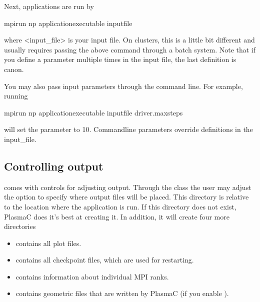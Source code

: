 \documentclass[letterpaper,10pt,english]{sphinxmanual}
\begin{document}
Next, applications are run by

\begin{sphinxVerbatim}[commandchars=\\\{\},formatcom=\scriptsize]
mpirun \PYGZhy{}np  \PYGZlt{}application\PYGZus{}executable\PYGZgt{} \PYGZlt{}input\PYGZus{}file\PYGZgt{}
\end{sphinxVerbatim}

where \textless{}input\_file\textgreater{} is your input file. On clusters, this is a little bit different and usually requires passing the above command through a batch system. Note that if you define a parameter multiple times in the input file, the last definition is canon.

You may also pass input parameters through the command line. For example, running

\begin{sphinxVerbatim}[commandchars=\\\{\},formatcom=\scriptsize]
mpirun \PYGZhy{}np  \PYGZlt{}application\PYGZus{}executable\PYGZgt{} \PYGZlt{}input\PYGZus{}file\PYGZgt{} driver.max\PYGZus{}steps
\end{sphinxVerbatim}

will set the  parameter to 10. Command\sphinxhyphen{}line parameters override definitions in the input\_file.


\subsection{Controlling output}
\label{\detokenize{Control:controlling-output}}\label{\detokenize{Control:chap-controllingoutput}}
 comes with controls for adjusting output. Through the {\hyperref[\detokenize{Driver:chap-driver}]{}} class the user may adjust the option  to specify where output files will be placed. This directory is relative to the location where the application is run. If this directory does not exist, PlasmaC does it’s best at creating it. In addition, it will create four more directories
\begin{itemize}
\item {} 
 contains all plot files.

\item {} 
 contains all checkpoint files, which are used for restarting.

\item {} 
 contains information about individual MPI ranks.

\item {} 
 contains geometric files that are written by PlasmaC (if you enable ).

\end{itemize}
\end{document}

